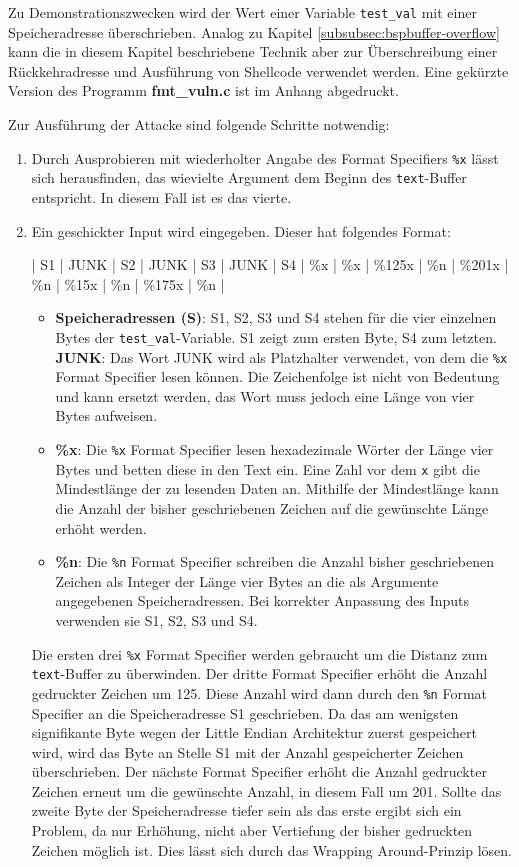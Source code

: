 \documentclass[11pt, a4paper]{article}
\begin{document}
Zu Demonstrationszwecken wird der Wert einer Variable \texttt{test\_val} mit einer Speicheradresse überschrieben. Analog zu Kapitel \ref{subsubsec:bspbuffer-overflow} kann die in diesem Kapitel beschriebene Technik aber zur Überschreibung einer Rückkehradresse und Ausführung von Shellcode verwendet werden. Eine gekürzte Version des Programm \textbf{fmt\_vuln.c} ist im Anhang abgedruckt. 

Zur Ausführung der Attacke sind folgende Schritte notwendig:
\begin{enumerate}
	\item Durch Ausprobieren mit wiederholter Angabe des Format Specifiers \texttt{\%x} lässt sich herausfinden, das wievielte Argument dem Beginn des \texttt{text}-Buffer entspricht. In diesem Fall ist es das vierte. 
	\item Ein geschickter Input wird eingegeben. Dieser hat folgendes Format:
	\newline
	\begin{center}
		\centerline{| S1 | JUNK | S2 | JUNK | S3 | JUNK | S4 | \%x | \%x | \%125x | \%n | \%201x | \%n | \%15x | \%n | \%175x | \%n |}
	\end{center}
	\begin{itemize}
		\item \textbf{Speicheradressen (S)}: S1, S2, S3 und S4 stehen für die vier einzelnen Bytes der \texttt{test\_val}-Variable. S1 zeigt zum ersten Byte, S4 zum letzten.
		\textbf{JUNK}: Das Wort JUNK wird als Platzhalter verwendet, von dem die \texttt{\%x} Format Specifier lesen können. Die Zeichenfolge ist nicht von Bedeutung und kann ersetzt werden, das Wort muss jedoch eine Länge von vier Bytes aufweisen.
		\item \textbf{\%x}: Die \texttt{\%x} Format Specifier lesen hexadezimale Wörter der Länge vier Bytes und betten diese in den Text ein. Eine Zahl vor dem \texttt{x} gibt die Mindestlänge der zu lesenden Daten an. Mithilfe der Mindestlänge kann die Anzahl der bisher geschriebenen Zeichen auf die gewünschte Länge erhöht werden.
		\item \textbf{\%n}: Die \texttt{\%n} Format Specifier schreiben die Anzahl bisher geschriebenen Zeichen als Integer der Länge vier Bytes an die als Argumente angegebenen Speicheradressen. Bei korrekter Anpassung des Inputs verwenden sie S1, S2, S3 und S4. 
	\end{itemize}
	Die ersten drei \texttt{\%x} Format Specifier werden gebraucht um die Distanz zum \texttt{text}-Buffer zu überwinden. Der dritte Format Specifier erhöht die Anzahl gedruckter Zeichen um 125. Diese Anzahl wird dann durch den \texttt{\%n} Format Specifier an die Speicheradresse S1 geschrieben. Da das am wenigsten signifikante Byte wegen der Little Endian Architektur zuerst gespeichert wird, wird das Byte an Stelle S1 mit der Anzahl gespeicherter Zeichen überschrieben. Der nächste Format Specifier erhöht die Anzahl gedruckter Zeichen erneut um die gewünschte Anzahl, in diesem Fall um 201. Sollte das zweite Byte der Speicheradresse tiefer sein als das erste ergibt sich ein Problem, da nur Erhöhung, nicht aber Vertiefung der bisher gedruckten Zeichen möglich ist. Dies lässt sich durch das Wrapping Around-Prinzip lösen. 

\end{enumerate}
\end{document}
